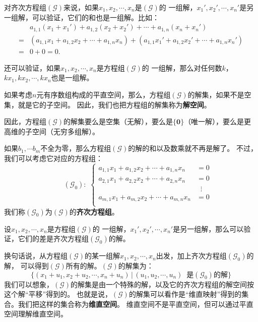 \documentclass[12pt,UTF8,fontset=none]{ctexbook}
\begin{document}
对齐次方程组$(\mathcal{G})$来说，如果$x_1, x_2, \cdots , x_n$是$(\mathcal{G})$的
一组解，$x_1', x_2', \cdots , x_n'$是另一组解，可以验证，它们的和也是一组解。比如：
\begin{align*}
     & a_{1,1} (x_1 + x_1') + a_{1,2} (x_2 + x_2') + \cdots + a_{1,n} (x_n + x_n') \\
    =& \left(a_{1,1} x_1 + a_{1,2} x_2 + \cdots + a_{1,n} x_n\right) + \left(a_{1,1} x_1' + a_{1,2} x_2' + \cdots + a_{1,n} x_n'\right) \\
    =& 0 + 0 = 0.
\end{align*}

还可以验证，如果$x_1, x_2, \cdots , x_n$是方程组$(\mathcal{G})$的
一组解，那么对任何数$k$，$kx_1, kx_2, \cdots , kx_n$也是一组解。

如果考虑$n$元有序数组构成的平直空间，那么，方程组$(\mathcal{G})$的解集，如果不是空集，就是它的子空间。
因此，我们也把方程组的解集称为\textbf{解空间}。

因此，方程组$(\mathcal{G})$的解集要么是空集（无解），要么是$\{\mathbf{0}\}$（唯一解），要么是更高维的子空间（无穷多组解）。

如果$b_1, \cdots b_m$不全为零，那么方程组$(\mathcal{G})$的解的和以及数乘就不再是解了。
不过，我们可以考虑它对应的方程组：
$$
\qquad (\mathcal{G}_0):\,\,
\left\{
    \begin{aligned}
        a_{1,1} x_1 + a_{1,2} x_2 + \cdots + a_{1,n} x_n &= 0 \\
        a_{2,1} x_1 + a_{2,2} x_2 + \cdots + a_{2,n} x_n &= 0 \\
        &\;\;\vdots \\
        a_{m,1} x_1 + a_{m,2} x_2 + \cdots + a_{m,n} x_n &= 0 \\
    \end{aligned}
\right.
$$
我们称$(\mathcal{G}_0)$为$(\mathcal{G})$的\textbf{齐次方程组}。

设$x_1, x_2, \cdots , x_n$是方程组$(\mathcal{G})$的
一组解，$x_1', x_2', \cdots , x_n'$是另一组解，那么可以验证，它们的差是齐次方程组$(\mathcal{G}_0)$的解。

换句话说，从方程组$(\mathcal{G})$的某一组解$x_1, x_2, \cdots , x_n$出发，加上齐次方程组$(\mathcal{G}_0)$的解，
可以得到$(\mathcal{G})$所有的解。$(\mathcal{G})$的解集为：
$$ \{(x_1+u_1, x_2+u_2, \cdots , x_n+u_n) \, | \, (u_1, u_2, \cdots, u_n) \;\; \mbox{是}(\mathcal{G}_0)\mbox{的解} \} $$
我们可以想象，$(\mathcal{G})$的解集是由一个特殊的解，以及它的齐次方程组的解空间按这个解“平移”得到的。
也就是说，$(\mathcal{G})$的解集可以看作是“维直映射”得到的集合。我们把这样的集合称为\textbf{维直空间}。
维直空间不是平直空间，但可以通过平直空间理解维直空间。
\end{document}
